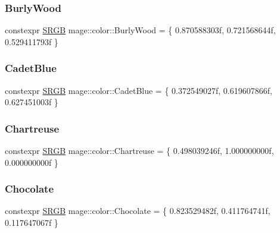 \subsubsection{\texorpdfstring{Burly\+Wood}{BurlyWood}}
{\footnotesize\ttfamily constexpr \hyperlink{structmage_1_1_s_r_g_b}{S\+R\+GB} mage\+::color\+::\+Burly\+Wood = \{ 0.\+870588303f, 0.\+721568644f, 0.\+529411793f \}}

\hypertarget{namespacemage_1_1color_a151445e7b496cce9be10d88db7014efb}{}\label{namespacemage_1_1color_a151445e7b496cce9be10d88db7014efb} 
\subsubsection{\texorpdfstring{Cadet\+Blue}{CadetBlue}}
{\footnotesize\ttfamily constexpr \hyperlink{structmage_1_1_s_r_g_b}{S\+R\+GB} mage\+::color\+::\+Cadet\+Blue = \{ 0.\+372549027f, 0.\+619607866f, 0.\+627451003f \}}

\hypertarget{namespacemage_1_1color_a8fa383463cb5d6a0ab8c60417b450c95}{}\label{namespacemage_1_1color_a8fa383463cb5d6a0ab8c60417b450c95} 
\subsubsection{\texorpdfstring{Chartreuse}{Chartreuse}}
{\footnotesize\ttfamily constexpr \hyperlink{structmage_1_1_s_r_g_b}{S\+R\+GB} mage\+::color\+::\+Chartreuse = \{ 0.\+498039246f, 1.\+000000000f, 0.\+000000000f \}}

\hypertarget{namespacemage_1_1color_a8866568c3674281524c92453d7877efd}{}\label{namespacemage_1_1color_a8866568c3674281524c92453d7877efd} 
\subsubsection{\texorpdfstring{Chocolate}{Chocolate}}
{\footnotesize\ttfamily constexpr \hyperlink{structmage_1_1_s_r_g_b}{S\+R\+GB} mage\+::color\+::\+Chocolate = \{ 0.\+823529482f, 0.\+411764741f, 0.\+117647067f \}}

\hypertarget{namespacemage_1_1color_ae8c9a8b1962f0827ff8e859efbe8400d}{}\label{namespacemage_1_1color_ae8c9a8b1962f0827ff8e859efbe8400d} 
